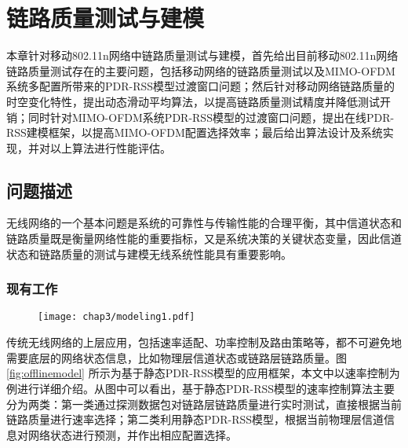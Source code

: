 

\chapter{链路质量测试与建模}
\label{chap:delivery}

本章针对移动802.11n网络中链路质量测试与建模，首先给出目前移动802.11n网络链路质量测试存在的主要问题，包括移动网络的链路质量测试以及MIMO-OFDM系统多配置所带来的PDR-RSS模型过渡窗口问题；然后针对移动网络链路质量的时空变化特性，提出动态滑动平均算法，以提高链路质量测试精度并降低测试开销；同时针对MIMO-OFDM系统PDR-RSS模型的过渡窗口问题，提出在线PDR-RSS建模框架，以提高MIMO-OFDM配置选择效率；最后给出算法设计及系统实现，并对以上算法进行性能评估。

\section{问题描述}
\label{sec:problem3}

无线网络的一个基本问题是系统的可靠性与传输性能的合理平衡，其中信道状态和链路质量既是衡量网络性能的重要指标，又是系统决策的关键状态变量，因此信道状态和链路质量的测试与建模无线系统性能具有重要影响。

\subsection{现有工作}
\label{sec:current3}

\begin{figure}[!htp]
\centering
\texttt{[image: chap3/modeling1.pdf]}
\end{figure}

传统无线网络的上层应用，包括速率适配、功率控制及路由策略等，都不可避免地需要底层的网络状态信息，比如物理层信道状态或链路层链路质量。图 \ref{fig:offlinemodel} 所示为基于静态PDR-RSS模型的应用框架，本文中以速率控制为例进行详细介绍。从图中可以看出，基于静态PDR-RSS模型的速率控制算法主要分为两类：第一类通过探测数据包对链路层链路质量进行实时测试，直接根据当前链路质量进行速率选择；第二类利用静态PDR-RSS模型，根据当前物理层信道信息对网络状态进行预测，并作出相应配置选择。


